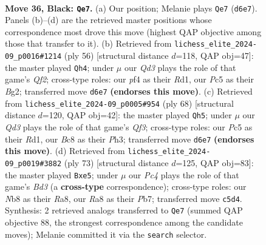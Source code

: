 \documentclass[11pt]{article}
\begin{document}
\clearpage

\begin{figure}[p]\centering
\begin{subfigure}{0.46\textwidth}\centering
\resizebox{\linewidth}{!}{%
\newchessgame
\chessboard[
  setfen={rnb4r/1p4k1/3qp3/p1p2p1p/PnNP1P2/5NP1/1P1QB1KP/4R2R b - - 0 36},
  showmover=false,
  pgfstyle=straightmove, color=movearrow, markmove={d6-e7}
]}
\caption{}
\end{subfigure}\hfill
\begin{subfigure}{0.46\textwidth}\centering
\resizebox{\linewidth}{!}{%
\newchessgame
\chessboard[
  setfen={2rrnk2/5ppp/p2pn3/1pqN2P1/4P1R1/P1P5/1P3QBP/3R3K w - - 3 29},
  showmover=false,
  pgfstyle=straightmove, color=movearrow, markmove={f2-h4}
]}
\caption{}
\end{subfigure}
\\[4pt]
\begin{subfigure}{0.46\textwidth}\centering
\resizebox{\linewidth}{!}{%
\newchessgame
\chessboard[
  setfen={2r1rbk1/1p3pp1/2q1p2p/2n5/pBP5/P1N2Q1P/1P3PP1/3RR1K1 w - - 5 35},
  showmover=false,
  pgfstyle=straightmove, color=movearrow, markmove={f3-h5}
]}
\caption{}
\end{subfigure}\hfill
\begin{subfigure}{0.46\textwidth}\centering
\resizebox{\linewidth}{!}{%
\newchessgame
\chessboard[
  setfen={r4nk1/1p2rp2/2pb1pbp/q3P3/p1P5/P1N1RNPP/1P1R1P2/4QBK1 b - - 0 37},
  showmover=false,
  pgfstyle=straightmove, color=movearrow, markmove={d6-e5}
]}
\caption{}
\end{subfigure}
\caption{\textbf{Move 36, Black: \texttt{Qe7}.} (a) Our position; Melanie plays \texttt{Qe7} (\texttt{d6e7}). Panels (b)--(d) are the retrieved master positions whose correspondence most drove this move (highest QAP objective among those that transfer to it). (b) Retrieved from \texttt{lichess\_elite\_2024-09\_p0016\#1214} (ply 56) [structural distance $d$=118, QAP obj=47]: the master played \texttt{Qh4}; under $\mu$ our \emph{Qd3} plays the role of that game's \emph{Qf2}; cross-type roles: our \emph{p}f4 as their \emph{R}d1, our \emph{P}c5 as their \emph{B}g2; transferred move \texttt{d6e7} \textbf{(endorses this move)}. (c) Retrieved from \texttt{lichess\_elite\_2024-09\_p0005\#954} (ply 68) [structural distance $d$=120, QAP obj=42]: the master played \texttt{Qh5}; under $\mu$ our \emph{Qd3} plays the role of that game's \emph{Qf3}; cross-type roles: our \emph{P}c5 as their \emph{R}d1, our \emph{B}c8 as their \emph{P}h3; transferred move \texttt{d6e7} \textbf{(endorses this move)}. (d) Retrieved from \texttt{lichess\_elite\_2024-09\_p0019\#3882} (ply 73) [structural distance $d$=125, QAP obj=83]: the master played \texttt{Bxe5}; under $\mu$ our \emph{Pc4} plays the role of that game's \emph{Bd3} (a \textbf{cross-type} correspondence); cross-type roles: our \emph{N}b8 as their \emph{R}a8, our \emph{R}a8 as their \emph{P}b7; transferred move \texttt{c5d4}. Synthesis: 2 retrieved analogs transferred to \texttt{Qe7} (summed QAP objective 88, the strongest correspondence among the candidate moves); Melanie committed it via the \texttt{search} selector.}
\label{fig:thought-m71}
\end{figure}
\end{document}
